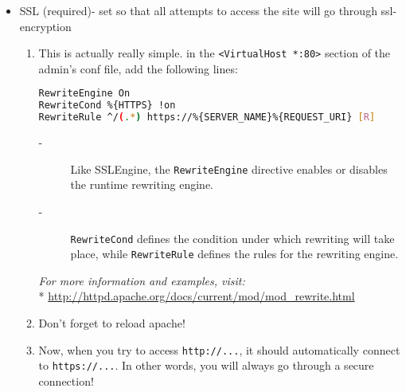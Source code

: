 \documentclass[11pt]{article}
\begin{document}
\begin {itemize}
\begin{enumerate}
    NOTE: There shoud be two lines of \verb|</IfDefine>| at the end of the config file. This is because the new \verb|<IfDefine>| section is nested within our \verb|<IfDefine DEFAULT_VHOST>| section.
    \\* \textit{For more information and examples, visit:}
    \\* \url{http://httpd.apache.org/docs/2.2/mod/mod_ssl.html}
    
    \item Don't forget to reload apache!
    
    \item Now you can try this out by using \verb|https://| in place of \verb|http://|. Since the certificate created is extremely sketchy, some browsers would ask if you really want to continue. Follow the steps to progress, and you should find yourself at the admin page once again. With the current settings, you will only go through a ssl-secured network when \verb|https://| is used. \verb|http://| will still go through normal, unsecure connections.
  
  \end{enumerate}
  
  \item SSL (required)- set so that all attempts to access the site will go through ssl-encryption
  \begin{enumerate}
  
    \item This is actually really simple. in the \verb|<VirtualHost *:80>| section of the admin's conf file, add the following lines:
    \begin{lstlisting}[basicstyle=\ttfamily, backgroundcolor = \color{lightgray}, language = bash, xleftmargin = 0cm, framexleftmargin = 1em, framexrightmargin = 8em, showstringspaces=false] 
RewriteEngine On
RewriteCond %{HTTPS} !on
RewriteRule ^/(.*) https://%{SERVER_NAME}%{REQUEST_URI} [R]
\end{lstlisting}
    \begin{description}
      \item[-] Like SSLEngine, the \verb|RewriteEngine| directive enables or disables the runtime rewriting engine.
      \item[-] \verb|RewriteCond| defines the condition under which rewriting will take place, while \verb|RewriteRule| defines the rules for the rewriting engine.
    \end{description}
    \textit{For more information and examples, visit:}
    \\* \url{http://httpd.apache.org/docs/current/mod/mod_rewrite.html}
    
    \item Don't forget to reload apache!
    
    \item Now, when you try to access \verb|http://...|, it should automatically connect to \verb|https://...|. In other words, you will always go through a secure connection!
  
  \end{enumerate}

\end{itemize}
\end{document}
